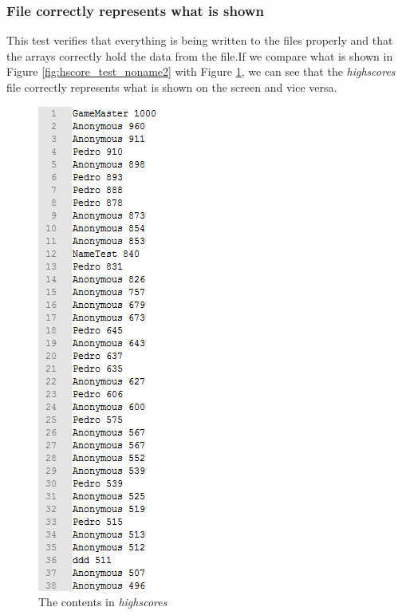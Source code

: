 \documentclass{article}
\begin{document}
\subsubsection*{File correctly represents what is shown}
This test verifies that everything is being written to the files properly and that the arrays correctly hold the data from the file.If we compare what is shown in Figure \ref{fig:hscore_test_noname2} with Figure \ref{fig:hscore_test_file}, we can see that the \emph{highscores} file correctly represents what is shown on the screen and vice versa.
\begin{figure}[!ht]
	\begin{center}
	\includegraphics[width=0.22\paperwidth]{images/hscore_test_file}
	\caption{The contents in \emph{highscores}}
	\label{fig:hscore_test_file} 
	\end{center}
\end{figure}
\clearpage
\end{document}
